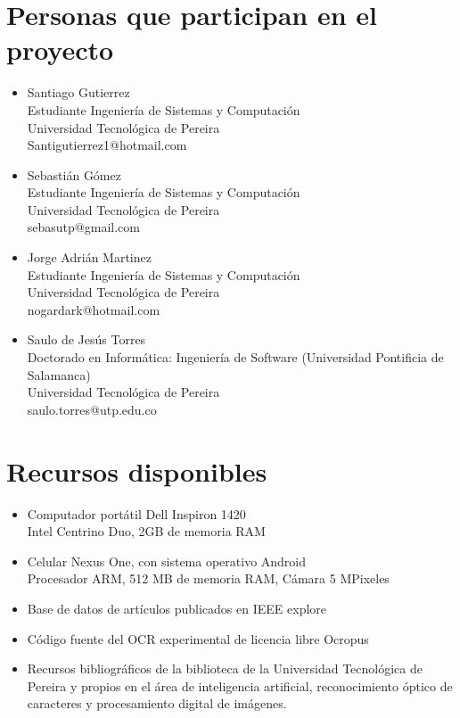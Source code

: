 \documentclass[a4paper, 11pt, oneside]{article}
\begin{document}
	\section{Personas que participan en el proyecto}
	\begin{itemize}
   \item Santiago Gutierrez\\
Estudiante Ingeniería de Sistemas y Computación\\
Universidad Tecnológica de Pereira\\
Santigutierrez1@hotmail.com
   \item Sebastián Gómez\\
Estudiante Ingeniería de Sistemas y Computación\\
Universidad Tecnológica de Pereira\\
sebasutp@gmail.com
   \item Jorge Adrián Martinez\\
Estudiante Ingeniería de Sistemas y Computación\\
Universidad Tecnológica de Pereira\\
nogardark@hotmail.com
   \item Saulo de Jesús Torres\\
Doctorado en Informática: Ingeniería de Software (Universidad Pontificia de Salamanca)\\
Universidad Tecnológica de Pereira\\
saulo.torres@utp.edu.co
	\end{itemize}
	\clearpage
	
	\section{Recursos disponibles}
	\begin{itemize}
		\item Computador portátil Dell Inspiron 1420\\
			Intel Centrino Duo, 2GB de memoria RAM
		\item Celular Nexus One, con sistema operativo Android\\
			Procesador ARM, 512 MB de memoria RAM, Cámara 5 MPixeles
		\item Base de datos de artículos publicados en IEEE explore
		\item Código fuente del OCR experimental de licencia libre Ocropus
	    \item Recursos bibliográficos de la biblioteca de la Universidad Tecnológica de Pereira y propios en el área de inteligencia artificial, reconocimiento óptico de caracteres y procesamiento digital de imágenes.
	\end{itemize}
	\clearpage
	
\end{document}
